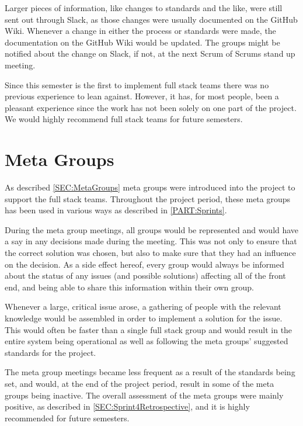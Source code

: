 Larger pieces of information, like changes to standards and the like, were still sent out through Slack, as those changes were usually documented on the GitHub Wiki.
Whenever a change in either the process or standards were made, the documentation on the GitHub Wiki would be updated. 
The groups might be notified about the change on Slack, if not, at the next Scrum of Scrums stand up meeting.

Since this semester is the first to implement full stack teams there was no previous experience to lean against. 
However, it has, for most people, been a pleasant experience since the work has not been solely on one part of the project.
We would highly recommend full stack teams for future semesters.

\section{Meta Groups}
As described \autoref{SEC:MetaGroups} meta groups were introduced into the project to support the full stack teams.
Throughout the project period, these meta groups has been used in various ways as described in \autoref{PART:Sprints}. 

During the meta group meetings, all groups would be represented and would have a say in any decisions made during the meeting.
This was not only to ensure that the correct solution was chosen, but also to make sure that they had an influence on the decision.
As a side effect hereof, every group would always be informed about the status of any issues (and possible solutions) affecting all of the front end, and being able to share this information within their own group.

Whenever a large, critical issue arose, a gathering of people with the relevant knowledge would be assembled in order to implement a solution for the issue. 
This would often be faster than a single full stack group and would result in the entire system being operational as well as following the meta groups' suggested standards for the project.
  
The meta group meetings became less frequent as a result of the standards being set, and would, at the end of the project period, result in some of the meta groups being inactive.
The overall assessment of the meta groups were mainly positive, as described in \autoref{SEC:Sprint4Retrospective}, and it is highly recommended for future semesters.
